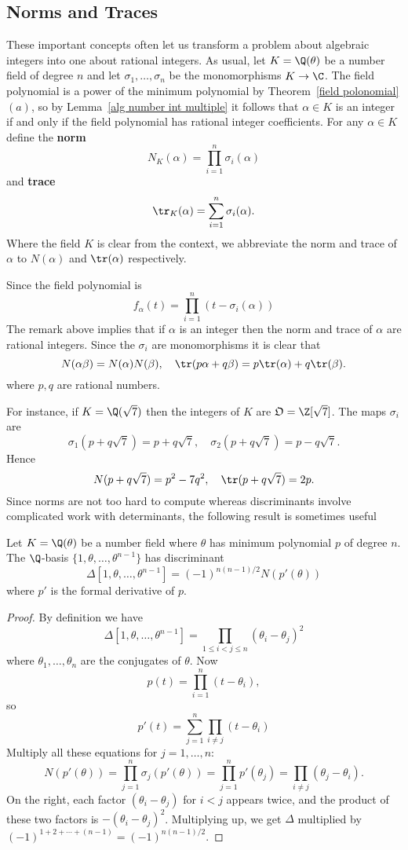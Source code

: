 \subsection{Norms and Traces}
These important concepts often let us transform a problem about algebraic integers into one about rational integers. As usual, let $K=\Q(\theta)$ be a number field of degree $n$ and let $\sigma_1,\dots,\sigma_n$ be the monomorphisms $K\to\C$. The field polynomial is a power of the minimum polynomial by Theorem~\ref{field polonomial}$(a)$, so by Lemma~\ref{alg number int multiple} it follows that $\alpha\in K$ is an integer if and only if the field polynomial has rational integer coefficients. For any $\alpha\in K$ define the \textbf{norm}
\[N_K(\alpha)=\prod_{i=1}^{n}\sigma_i(\alpha)\]
and \textbf{trace}
\[\tr_K(\alpha)=\sum_{i=1}^{n}\sigma_i(\alpha).\]
Where the field $K$ is clear from the context, we abbreviate the norm and trace of $\alpha$ to $N(\alpha)$ and $\tr(\alpha)$ respectively.\par
Since the field polynomial is
\[f_\alpha(t)=\prod_{i=1}^{n}(t-\sigma_i(\alpha))\]
The remark above implies that if $\alpha$ is an integer then the norm and trace of $\alpha$ are rational integers. Since the $\sigma_i$ are monomorphisms it is clear that
\[N(\alpha\beta)=N(\alpha)N(\beta),\quad\tr(p\alpha+q\beta)=p\tr(\alpha)+q\tr(\beta).\]
where $p,q$ are rational numbers.\par
For instance, if $K=\Q(\sqrt{7})$ then the integers of $K$ are $\mathfrak{O}=\Z[\sqrt{7}]$. The maps $\sigma_i$ are
\[\sigma_1(p+q\sqrt{7})=p+q\sqrt{7},\quad \sigma_2(p+q\sqrt{7})=p-q\sqrt{7}.\]
Hence
\[N(p+q\sqrt{7})=p^2-7q^2,\quad \tr(p+q\sqrt{7})=2p.\]
Since norms are not too hard to compute whereas discriminants involve complicated work with determinants, the following result is sometimes useful
\begin{proposition}\label{discriminant norm}
Let $K=\Q(\theta)$ be a number field where $\theta$ has minimum polynomial $p$ of degree $n$. The $\Q$-basis $\{1,\theta,\dots,\theta^{n-1}\}$ has discriminant
\[\Delta[1,\theta,\dots,\theta^{n-1}]=(-1)^{n(n-1)/2}N(p'(\theta))\]
where $p'$ is the formal derivative of $p$.
\end{proposition}
\begin{proof}
By definition we have
\[\Delta[1,\theta,\dots,\theta^{n-1}]=\prod_{1\leq i<j\leq n}(\theta_i-\theta_j)^2\]
where $\theta_1,\dots,\theta_n$ are the conjugates of $\theta$. Now
\[p(t)=\prod_{i=1}^{n}(t-\theta_i),\]
so
\[p'(t)=\sum_{j=1}^{n}\prod_{i\neq j}(t-\theta_i)\]
Multiply all these equations for $j=1,\dots,n$:
\[N(p'(\theta))=\prod_{j=1}^{n}\sigma_j(p'(\theta))=\prod_{j=1}^{n}p'(\theta_j)=\prod_{i\neq j}(\theta_j-\theta_i).\]
On the right, each factor $(\theta_i-\theta_j)$ for $i<j$ appears twice, and the product of these two factors is $-(\theta_i-\theta_j)^2$. Multiplying up, we get $\Delta$ multiplied by $(-1)^{1+2+\cdots+(n-1)}=(-1)^{n(n-1)/2}$.
\end{proof}
